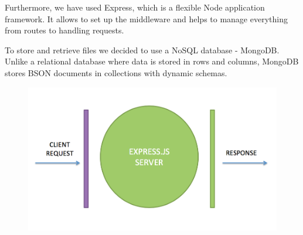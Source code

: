 \documentclass{article}
\begin{document}
Furthermore, we have used Express, which is a flexible Node application framework. It allows to set up the middleware and helps to manage everything from routes to handling requests.

To store and retrieve files we decided to use a NoSQL database - MongoDB. Unlike a relational database where data is stored in rows and columns, MongoDB stores BSON documents in collections with dynamic schemas.
\begin{figure}[h!]
\includegraphics[width=\linewidth]{expresspic.png}
\end{figure}
\end{document}
